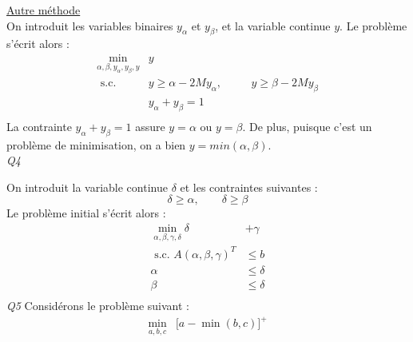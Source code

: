 \documentclass[a4paper,12pt]{article}
\begin{document}
    \underline{Autre méthode} \\
    On introduit les variables binaires $y_\alpha$ et $y_\beta$, et la variable continue $y$.
    Le problème s'écrit alors :
    \begin{equation}
        \begin{alignedat}{2}
            \min _{\alpha, \beta, y_\alpha, y_\beta, y} & y \\
            \text{ s.c. } 
            &y \geq \alpha - 2M y_\alpha, & \quad& y \geq \beta - 2M y_\beta \\
            &y_\alpha + y_\beta = 1 \\
        \end{alignedat}
    \end{equation}
    La contrainte $y_\alpha + y_\beta = 1$ assure  $y = \alpha$ ou $y = \beta$.
    De plus, puisque c'est un problème de minimisation, on a bien $y = min(\alpha, \beta)$. \\
    \textit{Q4 }

    On introduit la variable continue $\delta$ et les contraintes suivantes :
    $$ \delta \geq \alpha, \qquad \delta \geq \beta $$
    Le problème initial s'écrit alors :
    \begin{equation}
        \begin{aligned}
            \min _{\alpha, \beta, \gamma, \delta}  \delta &+ \gamma \\
            \text{ s.c. }  A(\alpha, \beta, \gamma)^T &\leq b \\
            \alpha &\leq \delta \\
            \beta &\leq \delta \\
        \end{aligned}
    \end{equation}
    \textit{Q5 }
    Considérons le problème suivant :
    \begin{equation}
        \begin{aligned}
            \min _{a, b, c} & \lbrack a - \min(b, c) \rbrack^+ \\
        \end{aligned}
        \label{linmin}
    \end{equation}
\end{document}
